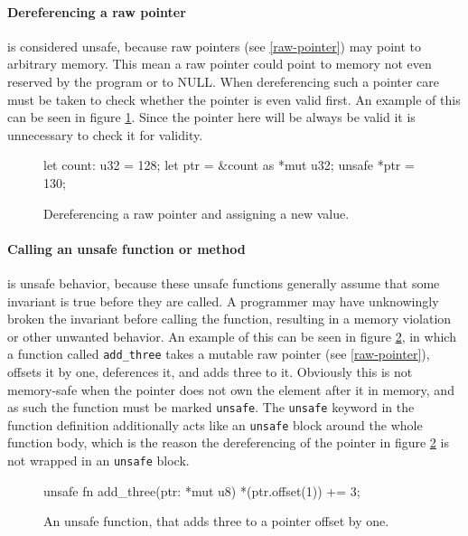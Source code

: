 \documentclass[twocolumn]{article}
\begin{document}
\paragraph{Dereferencing a raw pointer} is considered unsafe, because raw pointers (see \ref{raw-pointer}) may point to arbitrary memory.
This mean a raw pointer could point to memory not even reserved by the program or to NULL.
When dereferencing such a pointer care must be taken to check whether the pointer is even valid first.
An example of this can be seen in figure \ref{unsafe-derefencing}.
Since the pointer here will be always be valid it is unnecessary to check it for validity.
\begin{figure}
\begin{rustcode}
let count: u32 = 128;
let ptr = &count as *mut u32;
unsafe {
    *ptr = 130;
}
\end{rustcode}
\vspace{-2em}
\caption{Dereferencing a raw pointer and assigning a new value.}
\label{unsafe-derefencing}
\end{figure}
\paragraph{Calling an unsafe function or method} is unsafe behavior, because these unsafe functions generally assume that some invariant is true before they are called.
A programmer may have unknowingly broken the invariant before calling the function, resulting in a memory violation or other unwanted behavior.
An example of this can be seen in figure \ref{unsafe-function}, in which a function called \texttt{add_three} takes a mutable raw pointer (see \ref{raw-pointer}), offsets it by one, deferences it, and adds three to it.
Obviously this is not memory-safe when the pointer does not own the element after it in memory, and as such the function must be marked \texttt{unsafe}.
The \texttt{unsafe} keyword in the function definition additionally acts like an \texttt{unsafe} block around the whole function body, which is the reason the dereferencing of the pointer in figure \ref{unsafe-function} is not wrapped in an \texttt{unsafe} block.
\begin{figure}
\begin{rustcode}
unsafe fn add_three(ptr: *mut u8) {
        *(ptr.offset(1)) += 3;
}
\end{rustcode}
\vspace{-2em}
\caption{An unsafe function, that adds three to a pointer offset by one.}
\label{unsafe-function}
\end{figure}
\end{document}
